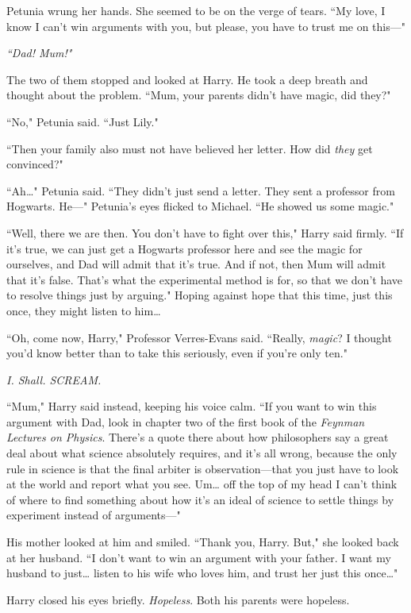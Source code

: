 Petunia wrung her hands. She seemed to be on the verge of tears. ``My love, I know I can't win arguments with you, but please, you have to trust me on this---"

\emph{``Dad! Mum!"}

The two of them stopped and looked at Harry. He took a deep breath and thought about the problem. ``Mum, your parents didn't have magic, did they?"

``No," Petunia said. ``Just Lily."

``Then your family also must not have believed her letter. How did \emph{they} get convinced?"

``Ah{\ldots}" Petunia said. ``They didn't just send a letter. They sent a professor from Hogwarts. He---" Petunia's eyes flicked to Michael. ``He showed us some magic."

``Well, there we are then. You don't have to fight over this," Harry said firmly. ``If it's true, we can just get a Hogwarts professor here and see the magic for ourselves, and Dad will admit that it's true. And if not, then Mum will admit that it's false. That's what the experimental method is for, so that we don't have to resolve things just by arguing." Hoping against hope that this time, just this once, they might listen to him{\ldots}

``Oh, come now, Harry," Professor Verres-Evans said. ``Really, \emph{magic}? I thought you'd know better than to take this seriously, even if you're only ten."

\emph{I. Shall. SCREAM.}

``Mum," Harry said instead, keeping his voice calm. ``If you want to win this argument with Dad, look in chapter two of the first book of the \emph{Feynman Lectures on Physics}. There's a quote there about how philosophers say a great deal about what science absolutely requires, and it's all wrong, because the only rule in science is that the final arbiter is observation---that you just have to look at the world and report what you see. Um{\ldots} off the top of my head I can't think of where to find something about how it's an ideal of science to settle things by experiment instead of arguments---"

His mother looked at him and smiled. ``Thank you, Harry. But," she looked back at her husband. ``I don't want to win an argument with your father. I want my husband to just{\ldots} listen to his wife who loves him, and trust her just this once{\ldots}"

Harry closed his eyes briefly. \emph{Hopeless}. Both his parents were hopeless.

